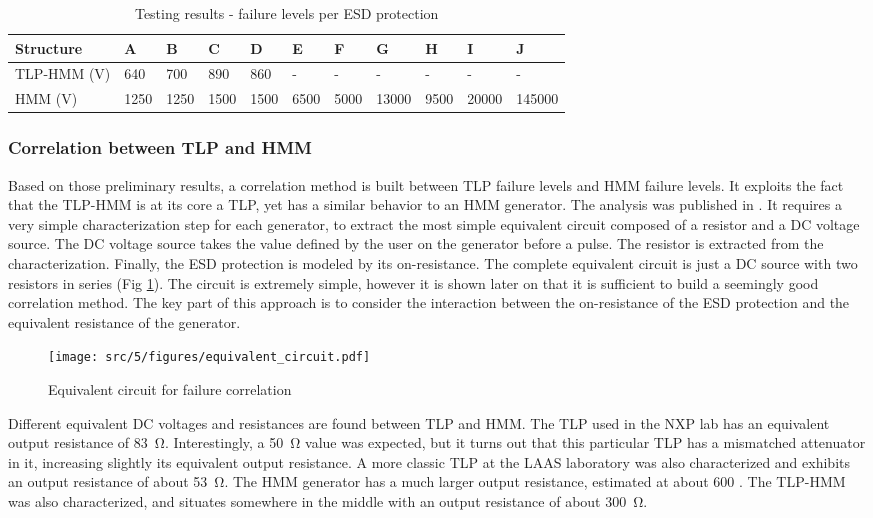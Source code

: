 \begin{table}[!h]
\centering
\begin{tabular}{@{}lllllllllll@{}}
\toprule
Structure   & A     & B     & C      & D    & E    & F    & G     & H    & I     & J      \\ \midrule
TLP-HMM (V) & 640   & 700   & 890    & 860  & -    & -    & -     & -    & -     & -      \\
HMM     (V) & 1250  & 1250  & 1500   & 1500 & 6500 & 5000 & 13000 & 9500 & 20000 & 145000 \\
\end{tabular}
\caption{Testing results - failure levels per ESD protection}
\label{tab:esd-protections}
\end{table}

\subsubsection{Correlation between TLP and HMM}

Based on those preliminary results, a correlation method is built between TLP failure levels and HMM failure levels.
It exploits the fact that the TLP-HMM is at its core a TLP, yet has a similar behavior to an HMM generator.
The analysis was published in \cite{my-publi-tlp-hmm}.
It requires a very simple characterization step for each generator, to extract the most simple equivalent circuit composed of a resistor and a DC voltage source.
The DC voltage source takes the value defined by the user on the generator before a pulse.
The resistor is extracted from the characterization.
Finally, the ESD protection is modeled by its on-resistance.
The complete equivalent circuit is just a DC source with two resistors in series (Fig \ref{fig:simple_equivalent_circuit}).
The circuit is extremely simple, however it is shown later on that it is sufficient to build a seemingly good correlation method.
The key part of this approach is to consider the interaction between the on-resistance of the ESD protection and the equivalent resistance of the generator.

\begin{figure}[!h]
  \centering
  \texttt{[image: src/5/figures/equivalent\_circuit.pdf]}
  \caption{Equivalent circuit for failure correlation}
  \label{fig:simple_equivalent_circuit}
\end{figure}

Different equivalent DC voltages and resistances are found between TLP and HMM.
The TLP used in the NXP lab has an equivalent output resistance of \SI{83}{\ohm}.
Interestingly, a \SI{50}{\ohm} value was expected, but it turns out that this particular TLP has a mismatched attenuator in it, increasing slightly its equivalent output resistance.
A more classic TLP at the LAAS laboratory was also characterized and exhibits an output resistance of about \SI{53}{\ohm}.
The HMM generator has a much larger output resistance, estimated at about 600 \textOmega{}.
The TLP-HMM was also characterized, and situates somewhere in the middle with an output resistance of about \SI{300}{\ohm}.

